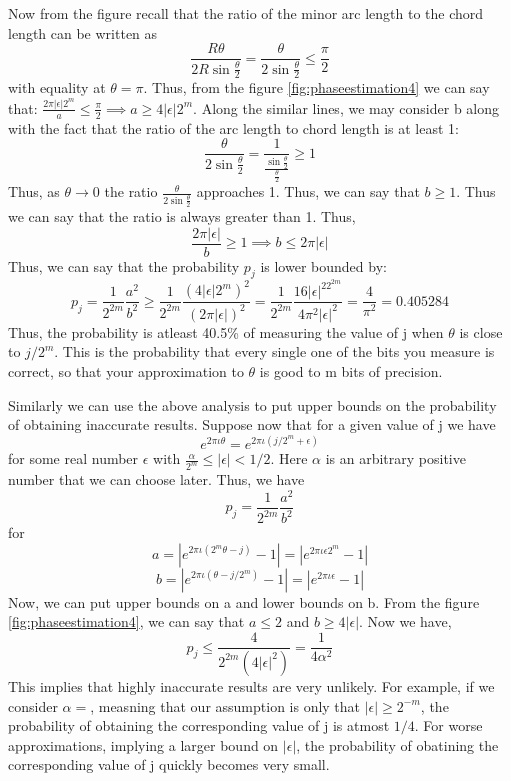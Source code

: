 \documentclass[12pt, oneside]{book}
\theoremstyle{definition}
\theoremstyle{definition}
\theoremstyle{remark}
\begin{document}
Now from the figure recall that the ratio of the minor arc length to the chord length can be written as
\[\frac{R\theta}{2R\sin \frac{\theta}{2}}=\frac{\theta}{2\sin \frac{\theta}{2}} \leq \frac{\pi}{2}\]
with equality at $\theta=\pi$. Thus, from the figure \ref{fig:phaseestimation4} we can say that: $\frac{2\pi|\epsilon|2^m}{a}\leq\frac{\pi}{2} \implies a\geq 4|\epsilon|2^m$.
Along the similar lines, we may consider b along with the fact that the ratio of the arc length to chord length is at least 1:
\[
    \frac{\theta}{2\sin \frac{\theta}{2}}=\dfrac{1}{\frac{\sin \frac{\theta}{2}}{\frac{\theta}{2}}}\geq 1
\]
Thus, as $\theta \rightarrow 0$ the ratio $\frac{\theta}{2\sin \frac{\theta}{2}}$ approaches 1. Thus, we can say that $b\geq 1$.
Thus we can say that the ratio is always greater than 1. Thus,
\[
\dfrac{2\pi|\epsilon|}{b}\geq 1 \implies b \leq 2\pi|\epsilon|
\]
Thus, we can say that the probability $p_j$ is lower bounded by:
\[
p_j=\frac{1}{2^{2m}}\frac{a^2}{b^2}\geq \frac{1}{2^{2m}}\frac{(4|\epsilon|2^m)^2}{(2\pi|\epsilon|)^2}=\frac{1}{2^{2m}}\frac{16|\epsilon|^22^{2m}}{4\pi^2|\epsilon|^2}=\frac{4}{\pi^2}=0.405284\]
Thus, the probability is atleast 40.5\% of measuring the value of j when $\theta$ is close to $j/2^m$. This is the probability that every single one of the bits you measure is correct, so that your approximation to $\theta$ is
good to m bits of precision.

Similarly we can use the above analysis to put upper bounds on the probability of obtaining inaccurate results. Suppose now that for a given value of j we have
\[
e^{2\pi\iota \theta}=e^{2\pi\iota(j/2^m+\epsilon)}
\]
for some real number $\epsilon$ with $\frac{\alpha}{2^m}\leq |\epsilon|<1/2$. Here $\alpha$ is an arbitrary positive number that we can choose later.
Thus, we have
\[
p_j=\frac{1}{2^{2m}}\frac{a^2}{b^2}
\]
for
\[
a=|e^{2\pi\iota(2^m\theta-j)}-1|=|e^{2\pi\iota\epsilon 2^m}-1|
\]
\[
b=|e^{2\pi\iota(\theta-j/2^m)}-1|=|e^{2\pi\iota\epsilon}-1|
\]
Now, we can put upper bounds on a and lower bounds on b. From the figure \ref{fig:phaseestimation4},
we can say that $a\leq2$ and $b\geq 4|\epsilon|$. Now we have,
\[p_j\leq \frac{4}{2^{2m}(4|\epsilon|^2)}=\frac{1}{4\alpha^2}\]
This implies that highly inaccurate results are very unlikely. For example, if we consider $\alpha=$, measning that our assumption is only that $|\epsilon|\geq 2^{-m}$, the probability of 
obtaining the corresponding value of j is atmost $1/4$. For worse approximations, implying a larger bound on $|\epsilon|$, the probability of obatining the corresponding value of j quickly
becomes very small.
\end{document}
